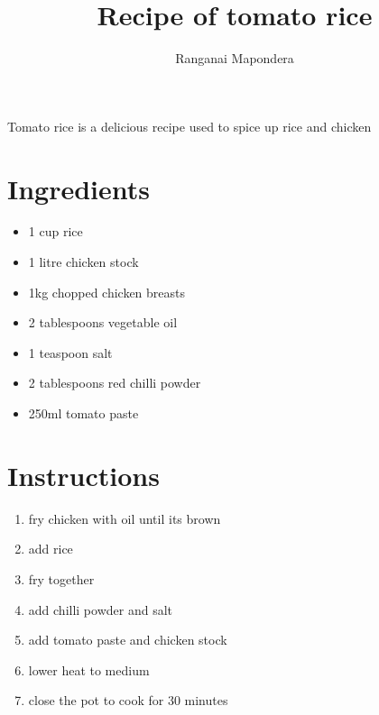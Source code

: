 \documentclass[journal]{IEEEtran}
\begin{document}
\title{Recipe of tomato rice}
\author{Ranganai Mapondera}
\maketitle

Tomato rice is a delicious recipe used to spice up rice and chicken

\section{Ingredients}

\begin {itemize}
\item 1 cup rice
\item 1 litre chicken stock
\item 1kg chopped chicken breasts
\item 2 tablespoons vegetable oil
\item 1 teaspoon salt
\item 2 tablespoons red chilli powder
\item 250ml tomato paste
\end{itemize}

\section{Instructions}
\begin{enumerate}
\item fry chicken with oil until its brown
\item add rice
\item fry together
\item add chilli powder and salt
\item add tomato paste and chicken stock
\item lower heat to medium
\item close the pot to cook for 30 minutes
\end{enumerate}
\end{document}
